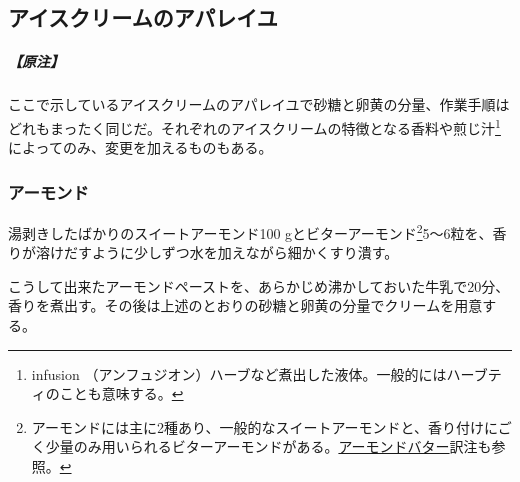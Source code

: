 \href{原稿下準備なし}{} \href{訳と注釈\%2020180405進行中}{}
\href{未、原文対照チェック}{} \href{未、日本語表現校正}{}
\href{未、注釈チェク}{} \href{未、原稿最終校正}{}

\hypertarget{compositions-diverses-de-glaces-cremes}{%
\subsection{アイスクリームのアパレイユ}\label{compositions-diverses-de-glaces-cremes}}


\href{このindexの行は強制改行を入れないようにしてください}{}

\hypertarget{nota-compositions-diverses-de-glaces-cremes}{%
\subparagraph{【原注】}\label{nota-compositions-diverses-de-glaces-cremes}}

ここで示しているアイスクリームのアパレイユで砂糖と卵黄の分量、作業手順はどれもまったく同じだ。それぞれのアイスクリームの特徴となる香料や煎じ汁\footnote{infusion
  （アンフュジオン）ハーブなど煮出した液体。一般的にはハーブティのことも意味する。}によってのみ、変更を加えるものもある。
\begin{recette}
\hypertarget{aux-amandes}{%
\subsubsection{アーモンド}\label{aux-amandes}}


\href{この節のインデックスのつけかたは要検討}{}

湯剥きしたばかりのスイートアーモンド100 gとビターアーモンド\footnote{アーモンドには主に2種あり、一般的なスイートアーモンドと、香り付けにごく少量のみ用いられるビターアーモンドがある。\protect\hyperlink{beurre-d-amande}{アーモンドバター}訳注も参照。}5〜6粒を、香りが溶けだすように少しずつ水を加えながら細かくすり潰す。

こうして出来たアーモンドペーストを、あらかじめ沸かしておいた牛乳で20分、香りを煮出す。その後は上述のとおりの砂糖と卵黄の分量でクリームを用意する。
\end{recette}